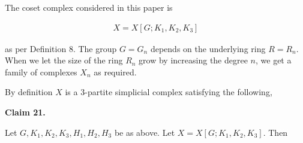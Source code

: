 


The coset complex considered in this paper is\par


\[\begin{gathered}
X=X[G;K_{1},K_{2},K_{3}]
\end{gathered}\]


as per Definition 8. The group $G=G_{n}$ depends on the underlying ring $R=R_{n}$. When we let the size of the ring $R_{n}$ grow by increasing the degree $n$, we get a family of complexes $X_{n}$ as required.\par




By definition $X$ is a $3$-partite simplicial complex satisfying the following,\par





\par\medskip\noindent\textbf{
Claim 21. 
}\par



Let $G,K_{1},K_{2},K_{3},H_{1},H_{2},H_{3}$ be as above. Let $X=X[G;K_{1},K_{2},K_{3}]$. Then\par


